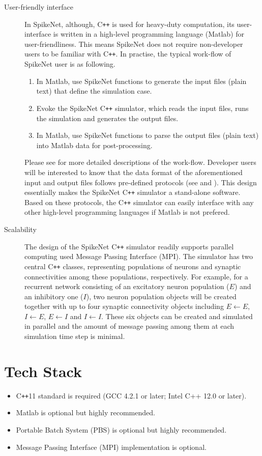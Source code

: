 \documentclass{article}
\begin{document}
\begin{description}
\item [User-friendly interface] In SpikeNet, although, C\texttt{++}  is used for heavy-duty computation, its user-interface is written in a high-level programming language (Matlab) for user-friendliness. This means SpikeNet does not require non-developer users to be familiar with C\texttt{++}. In practise, the typical work-flow of SpikeNet user is as following.
\begin{enumerate}
\item In Matlab, use SpikeNet functions to generate the input files (plain text) that define the simulation case.
\item Evoke the SpikeNet C\texttt{++} simulator, which reads the input files, runs the simulation and generates the output files.
\item In Matlab, use SpikeNet functions to parse the output files (plain text) into Matlab data for post-processing.
\end{enumerate}
Please see  for more detailed descriptions of the work-flow. Developer users will be interested to know that the data format of the aforementioned input and output files follows pre-defined protocols (see  and ). This design essentially makes the SpikeNet C\texttt{++} simulator a stand-alone software. Based on these protocols, the C\texttt{++} simulator can easily interface with any other high-level programming languages if Matlab is not prefered.

\item [Scalability] The design of the SpikeNet C\texttt{++} simulator readily supports parallel computing used Message Passing Interface (MPI). The simulator has two central C\texttt{++} classes, representing populations of neurons and synaptic connectivities among these populations, respectively. For example, for a recurrent network consisting of an excitatory neuron population ($E$) and an inhibitory one ($I$), two neuron population objects will be created together with up to four synaptic connectivity objects including $E\leftarrow E$, $I\leftarrow E$, $E\leftarrow I$ and $I\leftarrow I$. These six objects can be created and simulated in parallel and the amount of message passing among them at each simulation time step is minimal.  
\end{description}
 
\section{Tech Stack}
\begin{itemize}
\item C\texttt{++}11 standard is required (GCC 4.2.1 or later; Intel C++ 12.0 or later).
\item Matlab is optional but highly recommended.
\item Portable Batch System (PBS) is optional but highly recommended.
\item Message Passing Interface (MPI) implementation is optional.
\end{itemize}
 
\end{document}
